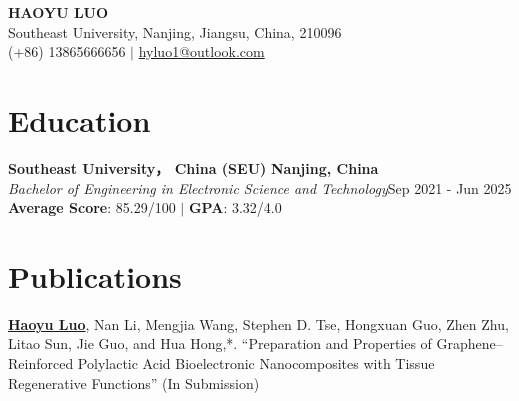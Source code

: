 \documentclass[letterpaper,11pt]{article}
\begin{document}
\begin{center}
    {\textbf{\huge HAOYU LUO}} \\ \vspace{8pt}
    \small Southeast University, Nanjing, Jiangsu, China, 210096\\\vspace{3pt}
    \small (+86) 13865666656 $|$
    \href{mailto:hyluo1@outlook.com}{hyluo1@outlook.com}
  
\end{center}

\section{\textbf{Education}}
{\bf Southeast University， China (SEU)} \hfill{\textbf{Nanjing, China}}\\
\textit{Bachelor of Engineering in Electronic Science and Technology}\hfill{Sep 2021 - Jun 2025}\\
\textbf{Average Score}: 85.29/100 $|$ \textbf{GPA}: 3.32/4.0 
\vspace{3pt}


\section{\textbf{Publications}}
\textbf{} \underline{\textbf{Haoyu Luo}}, Nan Li, Mengjia Wang, Stephen D. Tse, Hongxuan Guo, Zhen Zhu, Litao Sun, Jie Guo, and Hua Hong,*. 
\vspace{3pt}
\textbf{} {``Preparation and Properties of Graphene–Reinforced Polylactic Acid Bioelectronic Nanocomposites with Tissue Regenerative Functions'' (In Submission)}\\
\vspace{3pt}

\end{document}
